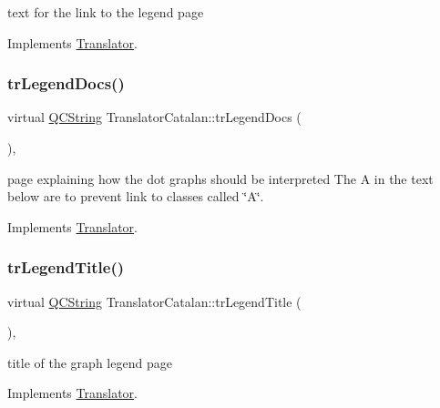 text for the link to the legend page 

Implements \mbox{\hyperlink{class_translator}{Translator}}.

\mbox{\label{class_translator_catalan_a622c204ce942ae49c803df91a32bfe6d}} 
\subsubsection{\texorpdfstring{trLegendDocs()}{trLegendDocs()}}
{\footnotesize\ttfamily virtual \mbox{\hyperlink{class_q_c_string}{Q\+C\+String}} Translator\+Catalan\+::tr\+Legend\+Docs (\begin{DoxyParamCaption}{ }\end{DoxyParamCaption})\hspace{0.3cm}{\ttfamily [inline]}, {\ttfamily [virtual]}}

page explaining how the dot graph\textquotesingle{}s should be interpreted The A in the text below are to prevent link to classes called \char`\"{}\+A\char`\"{}. 

Implements \mbox{\hyperlink{class_translator}{Translator}}.

\mbox{\label{class_translator_catalan_a051ccebe0759487fc87b287621e99e38}} 
\subsubsection{\texorpdfstring{trLegendTitle()}{trLegendTitle()}}
{\footnotesize\ttfamily virtual \mbox{\hyperlink{class_q_c_string}{Q\+C\+String}} Translator\+Catalan\+::tr\+Legend\+Title (\begin{DoxyParamCaption}{ }\end{DoxyParamCaption})\hspace{0.3cm}{\ttfamily [inline]}, {\ttfamily [virtual]}}

title of the graph legend page 

Implements \mbox{\hyperlink{class_translator}{Translator}}.

\mbox{\label{class_translator_catalan_a88185da6713f01dbf24f23d03b6a1b78}} 
